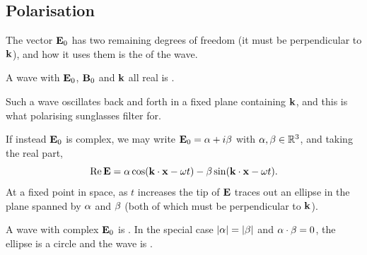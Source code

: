 \documentclass[a4paper]{scrartcl}
\begin{document}
\subsection{Polarisation}

The vector $\mathbf{E}_0$ has two remaining degrees of freedom (it must be perpendicular to $\mathbf{k}$), and how it uses them is the  of the wave.

\begin{definition}
	A wave with $\mathbf{E}_0$, $\mathbf{B}_0$ and $\mathbf{k}$ all real is .
\end{definition}

Such a wave oscillates back and forth in a fixed plane containing $\mathbf{k}$, and this is what polarising sunglasses filter for.

If instead $\mathbf{E}_0$ is complex, we may write $\mathbf{E}_0 = \mathbf{\alpha} + i \mathbf{\beta}$ with $\mathbf{\alpha}, \mathbf{\beta}\in \mathbb{R}^3$, and taking the real part,
$$
\operatorname{Re} \mathbf{E} = \mathbf{\alpha}\cos(\mathbf{k}\cdot\mathbf{x}-\omega t) - \mathbf{\beta}\sin(\mathbf{k}\cdot \mathbf{x}-\omega t).
$$
At a fixed point in space, as $t$ increases the tip of $\mathbf{E}$ traces out an ellipse in the plane spanned by $\mathbf{\alpha}$ and $\mathbf{\beta}$ (both of which must be perpendicular to $\mathbf{k}$).

\begin{definition}
	A wave with complex $\mathbf{E}_0$ is . In the special case $|\mathbf{\alpha}| = |\mathbf{\beta}|$ and $\mathbf{\alpha}\cdot\mathbf{\beta} = 0$, the ellipse is a circle and the wave is .
\end{definition}
\end{document}
